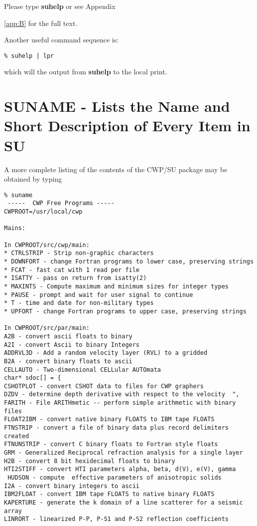 Please type {\bf suhelp\/} or see Appendix~{\ref{app:B} for the full text.

Another useful command sequence is:
\begin{verbatim}
% suhelp | lpr
\end{verbatim} \noindent
which will the output from {\bf suhelp\/} to the local print.


\section{SUNAME - Lists the Name and Short Description of Every Item in SU}

A more complete listing of the contents of the CWP/SU package
may be obtained by typing
{\small\begin{verbatim}
% suname
 -----  CWP Free Programs -----   
CWPROOT=/usr/local/cwp

Mains: 

In CWPROOT/src/cwp/main:
* CTRLSTRIP - Strip non-graphic characters
* DOWNFORT - change Fortran programs to lower case, preserving strings
* FCAT - fast cat with 1 read per file 
* ISATTY - pass on return from isatty(2)
* MAXINTS - Compute maximum and minimum sizes for integer types 
* PAUSE - prompt and wait for user signal to continue
* T - time and date for non-military types
* UPFORT - change Fortran programs to upper case, preserving strings

In CWPROOT/src/par/main:
A2B - convert ascii floats to binary 				
A2I - convert Ascii to binary Integers			
ADDRVL3D - Add a random velocity layer (RVL) to a gridded             
B2A - convert binary floats to ascii				
CELLAUTO - Two-dimensional CELLular AUTOmata			  	
char* sdoc[] = {
CSHOTPLOT - convert CSHOT data to files for CWP graphers		
DZDV - determine depth derivative with respect to the velocity	",  
FARITH - File ARITHmetic -- perform simple arithmetic with binary files
FLOAT2IBM - convert native binary FLOATS to IBM tape FLOATS	
FTNSTRIP - convert a file of binary data plus record delimiters created
FTNUNSTRIP - convert C binary floats to Fortran style floats	
GRM - Generalized Reciprocal refraction analysis for a single layer	
H2B - convert 8 bit hexidecimal floats to binary		
HTI2STIFF - convert HTI parameters alpha, beta, d(V), e(V), gamma	
 HUDSON - compute  effective parameters of anisotropic solids	        
I2A - convert binary integers to ascii				
IBM2FLOAT - convert IBM tape FLOATS to native binary FLOATS	
KAPERTURE - generate the k domain of a line scatterer for a seismic array
LINRORT - linearized P-P, P-S1 and P-S2 reflection coefficients 	


\end{verbatim}}}
